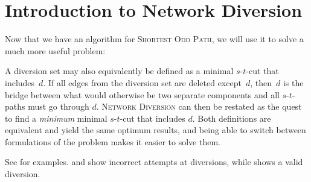 \section{Introduction to Network Diversion}

Now that we have an algorithm for \textsc{Shortest Odd Path}, we will use it to solve a much more useful problem:

\noindent{}

A diversion set may also equivalently be defined as a minimal $s$-$t$-cut that includes~$d$. If all edges from the diversion set are deleted except~$d$, then~$d$ is the bridge between what would otherwise be two separate components and all $s$-$t$-paths must go through $d$. \textsc{Network Diversion} can then be restated as the quest to find a \emph{minimum} minimal $s$-$t$-cut that includes $d$. Both definitions are equivalent and yield the same optimum results, and being able to switch between formulations of the problem makes it easier to solve them.

See  for examples.  and  show incorrect attempts at diversions, while  shows a valid diversion.

